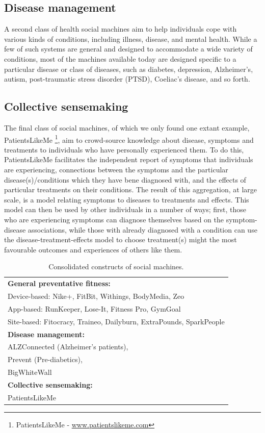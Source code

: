\documentclass{sig-alternate}
\begin{document}
\subsection{Disease management}

A second class of health social machines aim to help individuals cope
with various kinds of conditions, including illness, disease, and
mental health.  While a few of such systems are general and designed
to accommodate a wide variety of conditions, most of the machines
available today are designed specific to a particular disease or class
of diseases, such as diabetes, depression, Alzheimer's, autism,
post-traumatic stress disorder (PTSD), Coeliac's disease, and so
forth.

\subsection{Collective sensemaking}

The final class of social machines, of which we only found one extant
example, PatientsLikeMe \footnote{PatientsLikeMe -
  \url{www.patientslikeme.com}}, aim to crowd-source knowledge about
disease, symptoms and treatments to individuals who have personally
experienced them.  To do this, PatientsLikeMe facilitates the
independent report of symptoms that individuals are experiencing,
connections between the symptoms and the particular
disease(s)/conditions which they have bene diagnosed with, and the
effects of particular treatments on their conditions.  The result of
this aggregation, at large scale, is a model relating symptoms to
diseases to treatments and effects.  This model can then be used by
other individuals in a number of ways; first, those who are
experiencing symptoms can diagnose themselves based on the
symptom-disease associations, while those with already diagnosed with
a condition can use the disease-treatment-effects model to choose
treatment(s) might the most favourable outcomes and experiences of
others like them.

\begin{table}[htb]
\begin{center}
\begin{tabular}{|p{8cm}|}
\hline
{\bf General preventative fitness:} \\
Device-based: Nike+, FitBit, Withings, BodyMedia, Zeo \\
App-based: RunKeeper, Lose-It, Fitness Pro, GymGoal \\
Site-based: Fitocracy, Traineo, Dailyburn, ExtraPounds, SparkPeople  \\
\hline
{\bf Disease management:} \\
ALZConnected (Alzheimer's patients),  \\
Prevent (Pre-diabetics), \\
BigWhiteWall \\
\hline
{\bf Collective sensemaking:} \\
PatientsLikeMe \\
\hline
\end{tabular}
\end{center}
\caption{Consolidated constructs of social machines.} \label{table:clusters}
\end{table}
\end{document}

